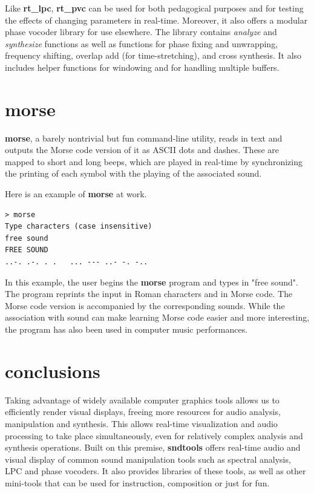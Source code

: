 \documentclass{article}
\begin{document}
Like {\bf rt\_lpc}, {\bf rt\_pvc} can be used for both pedagogical purposes and for testing the effects of changing parameters in real-time. Moreover, it also offers a modular phase vocoder library for use elsewhere. The library contains {\it analyze} and {\it synthesize} functions as well as functions for phase fixing and unwrapping, frequency shifting, overlap add (for time-stretching), and cross synthesis. It also includes helper functions for windowing and for handling multiple buffers. 


\section{morse}

{\bf morse}, a barely nontrivial but fun command-line utility, reads in text and outputs the Morse code version of it as ASCII dots and dashes. These are mapped to short and long beeps, which are played in real-time by synchronizing the printing of each symbol with the playing of the associated sound.

Here is an example of {\bf morse} at work. 
\begin{verbatim}
> morse
Type characters (case insensitive)
free sound
FREE SOUND
..-. .-. . .   ... --- ..- -. -.. 
\end{verbatim}

In this example, the user begins the {\bf morse} program and types in "free sound". The program reprints the input in Roman characters and in Morse code. The Morse code version is accompanied by the corresponding sounds. While the association with sound can make learning Morse code easier and more interesting, the program has also been used in computer music performances.

\section{conclusions}

Taking advantage of widely available computer graphics tools allows us to efficiently render visual displays, freeing more resources for audio analysis, manipulation and synthesis. This allows real-time visualization and audio processing to take place simultaneously, even for relatively complex analysis and synthesis operations. Built on this premise, {\bf sndtools} offers real-time audio and visual display of common sound manipulation tools such as spectral analysis, LPC and phase vocoders. It also provides libraries of these tools, as well as other %
mini-tools that can be used for instruction, composition or just for fun. 
\end{document}
